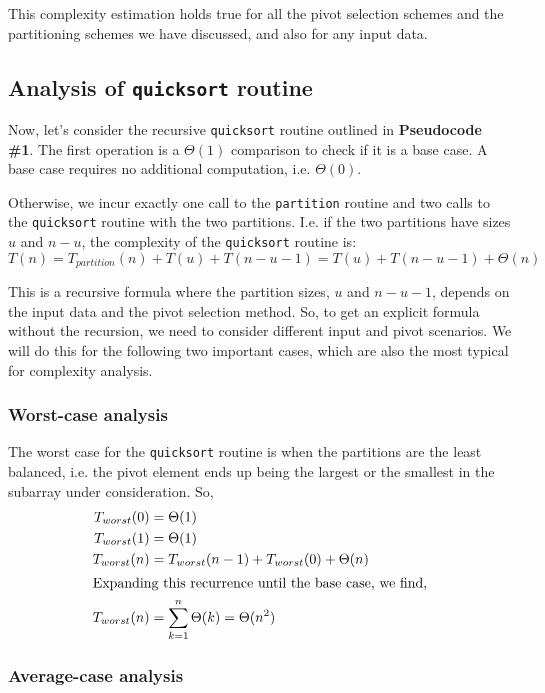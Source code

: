 \documentclass[]{finalproject}
\begin{document}
This complexity estimation holds true for all the pivot selection schemes and the partitioning schemes we have discussed, and also for any input data.

\subsection{Analysis of \texttt{quicksort} routine}

Now, let's consider the recursive \texttt{quicksort} routine outlined in \textbf{Pseudocode \#1}. The first operation is a $\Theta(1)$ comparison to check if it is a base case. A base case requires no additional computation, i.e. $\Theta(0)$.

Otherwise, we incur exactly one call to the \texttt{partition} routine and two calls to the \texttt{quicksort} routine with the two partitions. I.e. if the two partitions have sizes $u$ and $n-u$, the complexity of the \texttt{quicksort} routine is: $$T(n) = T_{partition}(n) + T(u) + T(n-u-1) = T(u) + T(n-u-1) + \Theta(n)$$

This is a recursive formula where the partition sizes, $u$ and $n-u-1$, depends on the input data and the pivot selection method. So, to get an explicit formula without the recursion, we need to consider different input and pivot scenarios. We will do this for the following two important cases, which are also the most typical for complexity analysis.

\subsubsection{Worst-case analysis}

The worst case for the \texttt{quicksort} routine is when the partitions are the least balanced, i.e. the pivot element ends up being the largest or the smallest in the subarray under consideration. So,
\begin{align*}
T_{worst}(0) &= \Theta(1) \\
T_{worst}(1) &= \Theta(1) \\
T_{worst}(n) &= T_{worst}(n-1) + T_{worst}(0) + \Theta(n) \\
\intertext{Expanding this recurrence until the base case, we find,}
T_{worst}(n) &= \sum_{k=1}^n\Theta(k) = \Theta(n^2)
\end{align*}

\subsubsection{Average-case analysis}
\end{document}
